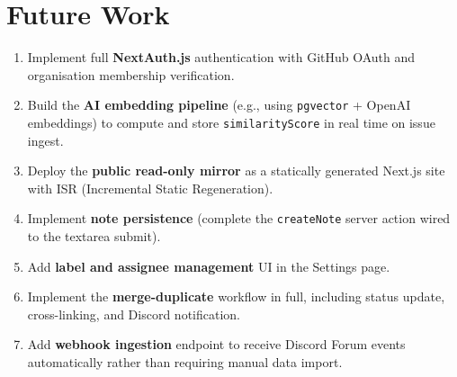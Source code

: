 \documentclass[12pt,a4paper]{report}
\begin{document}
\section{Future Work}

\begin{enumerate}
  \item Implement full \textbf{NextAuth.js} authentication with GitHub OAuth
    and organisation membership verification.
  \item Build the \textbf{AI embedding pipeline} (e.g., using
    \texttt{pgvector} + OpenAI embeddings) to compute and store
    \texttt{similarityScore} in real time on issue ingest.
  \item Deploy the \textbf{public read-only mirror} as a statically generated
    Next.js site with ISR (Incremental Static Regeneration).
  \item Implement \textbf{note persistence} (complete the \texttt{createNote}
    server action wired to the textarea submit).
  \item Add \textbf{label and assignee management} UI in the Settings page.
  \item Implement the \textbf{merge-duplicate} workflow in full, including
    status update, cross-linking, and Discord notification.
  \item Add \textbf{webhook ingestion} endpoint to receive Discord Forum events
    automatically rather than requiring manual data import.
\end{enumerate}
\end{document}
